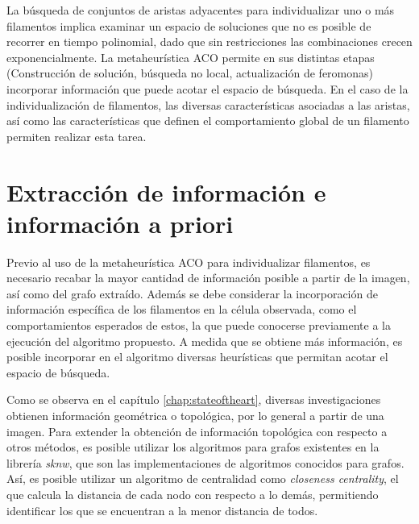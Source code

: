 La b\'usqueda de conjuntos de aristas adyacentes para individualizar uno o m\'as filamentos implica examinar un espacio de soluciones que no es posible de recorrer en tiempo polinomial, dado que sin restricciones las combinaciones crecen exponencialmente\cite{buchin2007number}\cite{biswas2012hamiltonian}. La metaheur\'istica ACO permite en sus distintas etapas (Construcci\'on de soluci\'on, b\'usqueda no local, actualizaci\'on de feromonas) incorporar informaci\'on que puede acotar el espacio de b\'usqueda. En el caso de la individualizaci\'on de filamentos, las diversas caracter\'isticas asociadas a las aristas, as\'i como las caracter\'isticas que definen el comportamiento global de un filamento permiten realizar esta tarea. 


\section{Extracci\'on de informaci\'on e informaci\'on a priori}

Previo al uso de la metaheur\'istica ACO para individualizar filamentos, es necesario recabar la mayor cantidad de informaci\'on posible a partir de la imagen, as\'i como del grafo extra\'ido. Adem\'as se debe considerar la incorporaci\'on de informaci\'on espec\'ifica de los filamentos en la c\'elula observada, como el comportamientos esperados de estos, la que puede conocerse previamente a la ejecuci\'on del algoritmo propuesto. A medida que se obtiene m\'as informaci\'on, es posible incorporar en el algoritmo diversas heur\'isticas que permitan acotar el espacio de b\'usqueda.

Como se observa en el cap\'itulo \ref{chap:stateoftheart}, diversas investigaciones obtienen informaci\'on geom\'etrica o topol\'ogica, por lo general a partir de una imagen. Para extender la obtenci\'on de informaci\'on topol\'ogica con respecto a otros m\'etodos, es posible utilizar los algoritmos para grafos existentes en la librer\'ia {\it sknw}, que son las implementaciones de algoritmos conocidos para grafos. As\'i, es posible utilizar un algoritmo de centralidad como {\it closeness centrality}, el que calcula la distancia de cada nodo con respecto a lo dem\'as, permitiendo identificar los que se encuentran a la menor distancia de todos.


